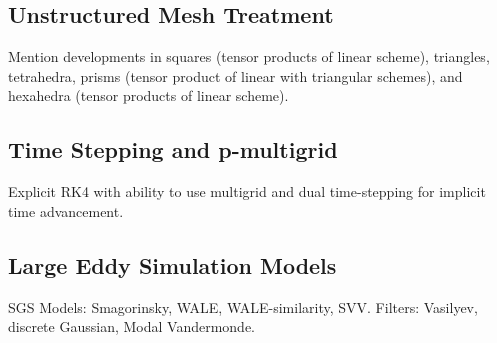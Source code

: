 

\subsection{Unstructured Mesh Treatment}
Mention developments in squares (tensor products of linear scheme), triangles\cite{castonguay2012new,williams2013tri}, tetrahedra\cite{williams2013tet}, prisms (tensor product of linear with triangular schemes), and hexahedra (tensor products of linear scheme).

\subsection{Time Stepping and p-multigrid}
Explicit RK4 with ability to use multigrid\cite{fidkowski2005p} and dual time-stepping\cite{Jameson1991DualTime} for implicit time advancement.


\subsection{Large Eddy Simulation Models}\label{lesmodels}
SGS Models: Smagorinsky\cite{smagorinsky1963}, WALE\cite{nicoud1999}, WALE-similarity\cite{lodato2009}, SVV\cite{karamanos2000}.
Filters: Vasilyev\cite{vasilyev1998,vasilyev2001}, discrete Gaussian\cite{lodato2012b}, Modal Vandermonde\cite{blackburn2003}.

